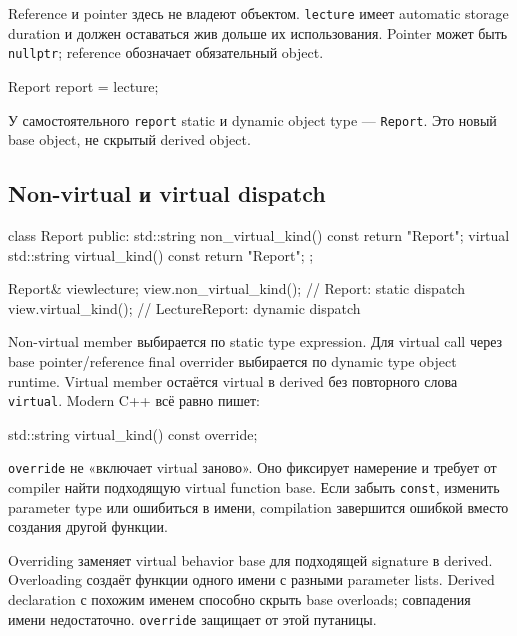 Reference и pointer здесь не владеют объектом. \texttt{lecture} имеет
automatic storage duration и должен оставаться жив дольше их использования.
Pointer может быть \texttt{nullptr}; reference обозначает обязательный object.

\begin{cppcode}
Report report = lecture;
\end{cppcode}

У самостоятельного \texttt{report} static и dynamic object type ---
\texttt{Report}. Это новый base object, не скрытый derived object.

\subsection{Non-virtual и virtual dispatch}

\begin{cppcode}
class Report {
public:
    std::string non_virtual_kind() const { return "Report"; }
    virtual std::string virtual_kind() const { return "Report"; }
};

Report& view{lecture};
view.non_virtual_kind(); // Report: static dispatch
view.virtual_kind();     // LectureReport: dynamic dispatch
\end{cppcode}

Non-virtual member выбирается по static type expression. Для virtual call
через base pointer/reference final overrider выбирается по dynamic type
object runtime. Virtual member остаётся virtual в derived без повторного
слова \texttt{virtual}. Modern C++ всё равно пишет:

\begin{cppcode}
std::string virtual_kind() const override;
\end{cppcode}

\texttt{override} не «включает virtual заново». Оно фиксирует намерение и
требует от compiler найти подходящую virtual function base. Если забыть
\texttt{const}, изменить parameter type или ошибиться в имени, compilation
завершится ошибкой вместо создания другой функции.

\begin{mistakebox}
Overriding заменяет virtual behavior base для подходящей signature в derived.
Overloading создаёт функции одного имени с разными parameter lists. Derived
declaration с похожим именем способно скрыть base overloads; совпадения имени
недостаточно. \texttt{override} защищает от этой путаницы.
\end{mistakebox}


